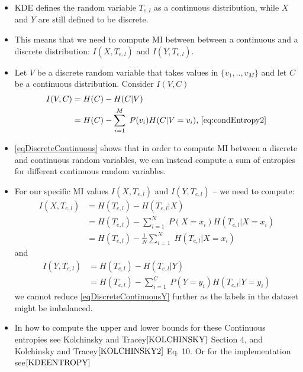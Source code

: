 \documentclass[dissertation.tex]{subfiles}
\begin{document}
\begin{itemize}
  \item{
      KDE defines the random variable $T_{e,l}$ as a continuous distribution,
      while $X$ and $Y$ are still defined to be discrete.
    }
  \item{
      This means that we need to compute MI between between a continuous and a
      discrete distribution: $I(X, T_{e,l})$ and $I(Y, T_{e,l})$.
    }
  \item{
      Let $V$ be a discrete random variable that takes values in $\{v_1,..,v_M\}$ and let $C$ be a continuous
      distribution. Consider $I(V, C)$ 
      \begin{align}
        I(V, C)&=H(C)-H(C|V) \nonumber\\&=
        H(C)-\sum_{i=1}^M\;P(v_i)H(C|V=v_i)
        \text{, \autoref{eq:condEntropy2}}
        \label{eqDiscreteContinuous}
      \end{align}
    }
  \item{
      \autoref{eqDiscreteContinuous} shows that in order to compute MI between a
      discrete and continuous random variables, we can instead compute a sum of
      entropies for different continuous random variables.
    }
  \item{
      For our specific MI values $I(X, T_{e,l})$ and $I(Y, T_{e,l})$ -- we need to
      compute:
      \begin{align}
        I(X, T_{e,l})&=H(T_{e,l})-H(T_{e,l}|X) 
        \nonumber\\&=
        H(T_{e,l})-\sum_{i=1}^N\;P(X=x_i)H(T_{e,l}|X=x_i)
        \nonumber\\&=
        H(T_{e,l})-\frac{1}{N}\sum_{i=1}^N\;H(T_{e,l}|X=x_i)
        \label{eqDiscreteContinuousX}
      \end{align}
      and
      \begin{align}
        I(Y, T_{e,l})&=H(T_{e,l})-H(T_{e,l}|Y) 
        \nonumber\\&=
        H(T_{e,l})-\sum_{i=1}^C\;P(Y=y_i)H(T_{e,l}|Y=y_i)
        \label{eqDiscreteContinuousY}
      \end{align}
      we cannot reduce \autoref{eqDiscreteContinuousY} further as the labels in
      the dataset might be imbalanced.
    }
  \item{
      In how to compute the upper and lower bounds for these Continuous
      entropies see Kolchinsky and Tracey$\cite{KOLCHINSKY}$ Section 4, and
      Kolchinsky and Tracey$\cite{KOLCHINSKY2}$ Eq. 10. Or for the
      implementation see$\cite{KDEENTROPY}$
    }
\end{itemize}
\end{document}
